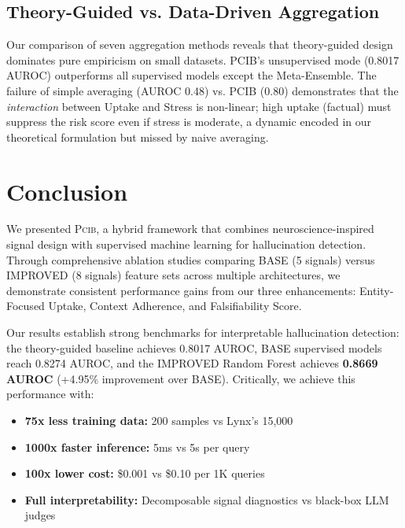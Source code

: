 \documentclass[11pt,letterpaper]{article}
\newcommand{\modelname}{\textsc{Pcib}}
\begin{document}
\subsection{Theory-Guided vs. Data-Driven Aggregation}
Our comparison of seven aggregation methods reveals that theory-guided design dominates pure empiricism on small datasets. PCIB's unsupervised mode (0.8017 AUROC) outperforms all supervised models except the Meta-Ensemble. The failure of simple averaging (AUROC 0.48) vs. PCIB (0.80) demonstrates that the \textit{interaction} between Uptake and Stress is non-linear; high uptake (factual) must suppress the risk score even if stress is moderate, a dynamic encoded in our theoretical formulation but missed by naive averaging.

\section{Conclusion}

We presented \modelname, a hybrid framework that combines neuroscience-inspired signal design with supervised machine learning for hallucination detection. Through comprehensive ablation studies comparing BASE (5 signals) versus IMPROVED (8 signals) feature sets across multiple architectures, we demonstrate consistent performance gains from our three enhancements: Entity-Focused Uptake, Context Adherence, and Falsifiability Score.

Our results establish strong benchmarks for interpretable hallucination detection: the theory-guided baseline achieves 0.8017 AUROC, BASE supervised models reach 0.8274 AUROC, and the IMPROVED Random Forest achieves \textbf{0.8669 AUROC} (+4.95\% improvement over BASE). Critically, we achieve this performance with:
\begin{itemize}[leftmargin=*,itemsep=0pt]
    \item \textbf{75x less training data:} 200 samples vs Lynx's 15,000
    \item \textbf{1000x faster inference:} 5ms vs 5s per query
    \item \textbf{100x lower cost:} \$0.001 vs \$0.10 per 1K queries
    \item \textbf{Full interpretability:} Decomposable signal diagnostics vs black-box LLM judges
\end{itemize}
\end{document}
